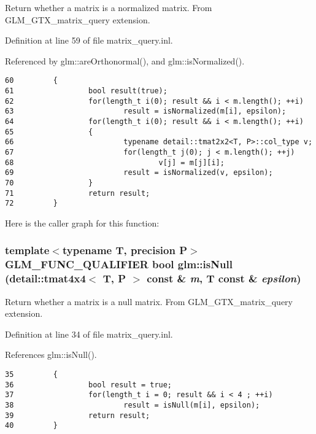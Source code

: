 Return whether a matrix is a normalized matrix. From GLM\_\-GTX\_\-matrix\_\-query extension. 

Definition at line 59 of file matrix\_\-query.inl.

Referenced by glm::areOrthonormal(), and glm::isNormalized().

\begin{Code}\begin{verbatim}60         {
61                 bool result(true);
62                 for(length_t i(0); result && i < m.length(); ++i)
63                         result = isNormalized(m[i], epsilon);
64                 for(length_t i(0); result && i < m.length(); ++i)
65                 {
66                         typename detail::tmat2x2<T, P>::col_type v;
67                         for(length_t j(0); j < m.length(); ++j)
68                                 v[j] = m[j][i];
69                         result = isNormalized(v, epsilon);
70                 }
71                 return result;
72         }
\end{verbatim}
\end{Code}




Here is the caller graph for this function:\hypertarget{group__gtx__matrix__query_g227812585b9411f506b157afcda55e9c}{
\subsubsection[isNull]{\setlength{\rightskip}{0pt plus 5cm}template$<$typename T, precision P$>$ GLM\_\-FUNC\_\-QUALIFIER bool glm::isNull (detail::tmat4x4$<$ T, P $>$ const \& {\em m}, \/  T const \& {\em epsilon})}}
\label{group__gtx__matrix__query_g227812585b9411f506b157afcda55e9c}


Return whether a matrix is a null matrix. From GLM\_\-GTX\_\-matrix\_\-query extension. 

Definition at line 34 of file matrix\_\-query.inl.

References glm::isNull().

\begin{Code}\begin{verbatim}35         {
36                 bool result = true;
37                 for(length_t i = 0; result && i < 4 ; ++i)
38                         result = isNull(m[i], epsilon);
39                 return result;
40         }
\end{verbatim}
\end{Code}




